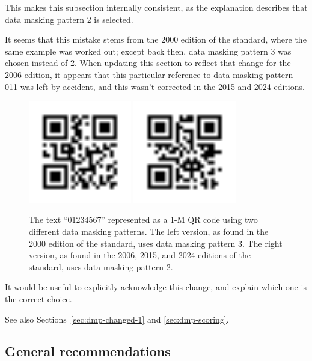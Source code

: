 \documentclass[a4paper,twoside]{article}
\begin{document}
This makes this subsection internally consistent, as the explanation describes that data masking pattern 2 is selected.

It seems that this mistake stems from the 2000 edition of the standard, where the same example was
worked out; except back then, data masking pattern 3 was chosen instead of 2.  When updating this
section to reflect that change for the 2006 edition, it appears that this particular  reference to
data masking pattern 011 was left by accident, and this wasn't corrected in the 2015 and 2024 editions.

\begin{figure}[h]
\centering
\includegraphics[width=0.4\textwidth]{images/qrcode_iso18004_2000_AnnexG_1Mp3.png}
\includegraphics[width=0.4\textwidth]{images/qrcode_iso18004_2006_2015_2024_AnnexI_1Mp2.png}
\caption{The text ``01234567'' represented as a 1-M QR code using two different data masking patterns.
         The left version, as found in the 2000 edition of the standard, uses data masking pattern 3.
         The right version, as found in the 2006, 2015, and 2024 editions of the standard, uses data masking pattern 2.}
\end{figure}

It would be useful to explicitly acknowledge this change, and explain which one is the correct choice.

See also Sections~\ref{sec:dmp-changed-1} and \ref{sec:dmp-scoring}.

\subsection{General recommendations}
\end{document}
